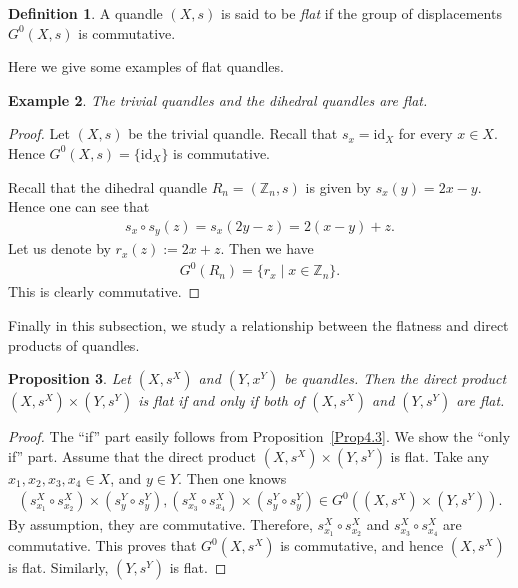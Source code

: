\documentclass[12pt]{amsart}
\newtheorem{Prop}{Proposition}[section]
\newtheorem{Ex}[Prop]{Example}
\theoremstyle{definition}
\newtheorem{Def}[Prop]{Definition}
\begin{document}
\begin{Def}\label{Def4.5}
A quandle $ (X,s) $ is said to be \textit{flat} if the group of displacements $ G^{0}(X,s) $ is commutative.
\end{Def}

Here we give some examples of flat quandles.

\begin{Ex}\label{Ex4.6}
The trivial quandles and the dihedral quandles are flat.
\end{Ex}

\begin{proof}
Let $ (X,s) $ be the trivial quandle. Recall that $ s_{x} = {\mathrm{id}}_{X} $ for every $ x \in X $. Hence $ G^{0}(X,s) = \{ {\mathrm{id}}_{X} \} $ is commutative.

Recall that the dihedral quandle $ R_{n} = ({{\mathbb Z}}_{n},s) $ is given by $ s_{x}(y) = 2x-y $. Hence one can see that
\begin{align*}
s_{x} \circ s_{y}(z) = s_{x}(2y-z) = 2(x-y)+z.
\end{align*}
Let us denote by $ r_{x}(z) := 2x + z $. Then we have
\begin{align*}
G^{0}(R_{n}) = \{ r_{x} \mid x \in {{\mathbb Z}}_{n} \}.
\end{align*}
This is clearly commutative.
\end{proof}

Finally in this subsection, we study a relationship between the flatness and direct products of quandles.

\begin{Prop}\label{Prop4.7}
Let $ (X,s^{X}) $ and $ (Y,x^{Y}) $ be quandles. Then the direct product $ (X,s^{X}) \times (Y,s^{Y}) $ is flat if and only if both of $ (X,s^{X}) $ and $ (Y,s^{Y}) $ are flat.
\end{Prop}

\begin{proof}
The ``if'' part easily follows from Proposition~\ref{Prop4.3}. We show the ``only if'' part. Assume that the direct product $ (X,s^{X}) \times (Y,s^{Y}) $ is flat. Take any $ x_{1}, x_{2}, x_{3}, x_{4} \in X $, and $ y \in Y $. Then one knows 
\begin{align*}
( s^{X}_{x_{1}} \circ s^{X}_{x_{2}} ) \times ( s^{Y}_{y} \circ s^{Y}_{y} ), ( s^{X}_{x_{3}} \circ s^{X}_{x_{4}} ) \times ( s^{Y}_{y} \circ s^{Y}_{y} ) \in G^{0}((X,s^{X}) \times (Y,s^{Y})).
\end{align*}
By assumption, they are commutative. Therefore, $ s^{X}_{x_{1}} \circ s^{X}_{x_{2}} $ and $ s^{X}_{x_{3}} \circ s^{X}_{x_{4}} $ are commutative. This proves that $ G^{0}(X,s^{X}) $ is commutative, and hence $ (X,s^{X}) $ is flat. Similarly, $ (Y,s^{Y}) $ is flat.
\end{proof}
\end{document}
